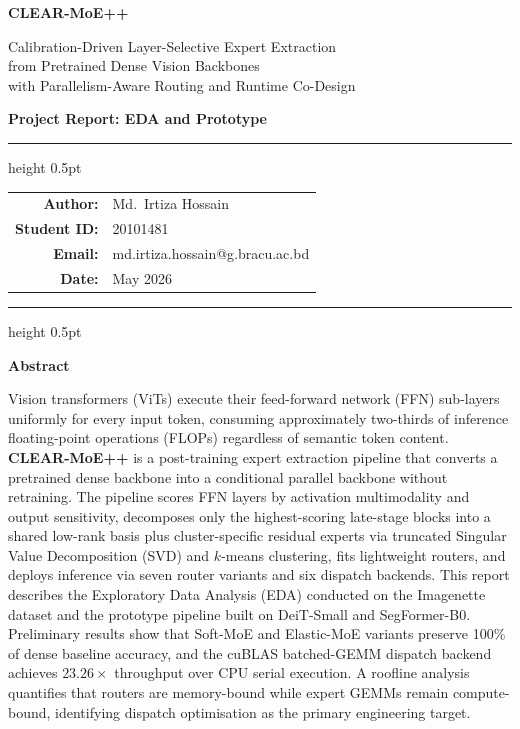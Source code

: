 \documentclass[12pt,a4paper]{article}
\newcommand{\clearmoep}{\textbf{CLEAR-MoE++}}
\begin{document}
\begin{titlepage}
\centering
\vspace*{2cm}

{\LARGE\bfseries CLEAR-MoE++\par}
\vspace{0.5em}
{\Large Calibration-Driven Layer-Selective Expert Extraction\\
from Pretrained Dense Vision Backbones\\[0.3em]
with Parallelism-Aware Routing and Runtime Co-Design\par}

\vspace{2em}
{\large\textbf{Project Report: EDA and Prototype}\par}

\vspace{3em}
\hrule height 0.5pt
\vspace{1em}

\begin{tabular}{rl}
\textbf{Author:}     & Md.\ Irtiza Hossain \\
\textbf{Student ID:} & 20101481 \\
\textbf{Email:}      & md.irtiza.hossain@g.bracu.ac.bd \\
\textbf{Date:}       & May 2026 \\
\end{tabular}

\vspace{1em}
\hrule height 0.5pt
\vspace{3em}

{\large\textbf{Abstract}\par}
\vspace{0.8em}
\begin{minipage}{0.88\textwidth}
Vision transformers (ViTs) execute their feed-forward network (FFN)
sub-layers uniformly for every input token, consuming approximately
two-thirds of inference floating-point operations (FLOPs) regardless
of semantic token content.
\clearmoep{} is a post-training expert extraction pipeline that
converts a pretrained dense backbone into a conditional parallel backbone
without retraining.
The pipeline scores FFN layers by activation multimodality and output
sensitivity, decomposes only the highest-scoring late-stage blocks into a
shared low-rank basis plus cluster-specific residual experts via truncated
Singular Value Decomposition (SVD) and $k$-means clustering, fits
lightweight routers, and deploys inference via seven router variants and
six dispatch backends.
This report describes the Exploratory Data Analysis (EDA) conducted
on the Imagenette dataset and the prototype pipeline built on
DeiT-Small and SegFormer-B0.
Preliminary results show that Soft-MoE and Elastic-MoE variants preserve
100\% of dense baseline accuracy, and the cuBLAS batched-GEMM dispatch
backend achieves $23.26\times$ throughput over CPU serial execution.
A roofline analysis quantifies that routers are memory-bound while expert
GEMMs remain compute-bound, identifying dispatch optimisation as the
primary engineering target.
\end{minipage}


\end{titlepage}
\end{document}
